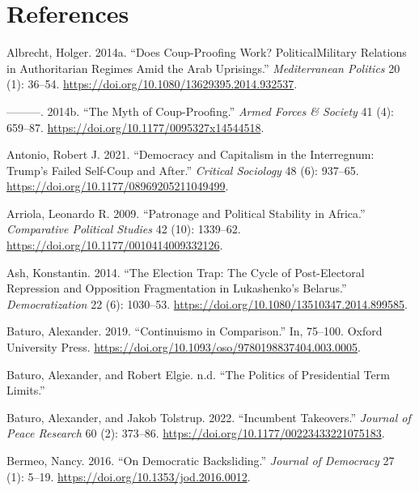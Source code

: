 \documentclass[
  12pt,
]{report}
\newlength{\cslhangindent}
\newenvironment{CSLReferences}[2] %
 {\begin{list}{}{%
  \setlength{\itemindent}{0pt}
  \setlength{\leftmargin}{0pt}
  \setlength{\parsep}{0pt}
  \ifodd #1
   \setlength{\leftmargin}{\cslhangindent}
   \setlength{\itemindent}{-1\cslhangindent}
  \fi
  \setlength{\itemsep}{#2\baselineskip}}}
 {\end{list}}
\begin{document}
\chapter*{References}\label{references}

\label{refs}
\begin{CSLReferences}{1}{0}
Albrecht, Holger. 2014a. {``Does Coup-Proofing Work?
Political{\textendash}Military Relations in Authoritarian Regimes Amid
the Arab Uprisings.''} \emph{Mediterranean Politics} 20 (1): 36--54.
\url{https://doi.org/10.1080/13629395.2014.932537}.

---------. 2014b. {``The Myth of Coup-Proofing.''} \emph{Armed Forces \&
Society} 41 (4): 659--87.
\url{https://doi.org/10.1177/0095327x14544518}.

Antonio, Robert J. 2021. {``Democracy and Capitalism in the Interregnum:
Trump{'}s Failed Self-Coup and After.''} \emph{Critical Sociology} 48
(6): 937--65. \url{https://doi.org/10.1177/08969205211049499}.

Arriola, Leonardo R. 2009. {``Patronage and Political Stability in
Africa.''} \emph{Comparative Political Studies} 42 (10): 1339--62.
\url{https://doi.org/10.1177/0010414009332126}.

Ash, Konstantin. 2014. {``The Election Trap: The Cycle of Post-Electoral
Repression and Opposition Fragmentation in Lukashenko's Belarus.''}
\emph{Democratization} 22 (6): 1030--53.
\url{https://doi.org/10.1080/13510347.2014.899585}.

Baturo, Alexander. 2019. {``Continuismo in Comparison.''} In, 75--100.
Oxford University Press.
\url{https://doi.org/10.1093/oso/9780198837404.003.0005}.

Baturo, Alexander, and Robert Elgie. n.d. {``The Politics of
Presidential Term Limits.''}

Baturo, Alexander, and Jakob Tolstrup. 2022. {``Incumbent Takeovers.''}
\emph{Journal of Peace Research} 60 (2): 373--86.
\url{https://doi.org/10.1177/00223433221075183}.

Bermeo, Nancy. 2016. {``On Democratic Backsliding.''} \emph{Journal of
Democracy} 27 (1): 5--19. \url{https://doi.org/10.1353/jod.2016.0012}.


\end{CSLReferences}
\end{document}
